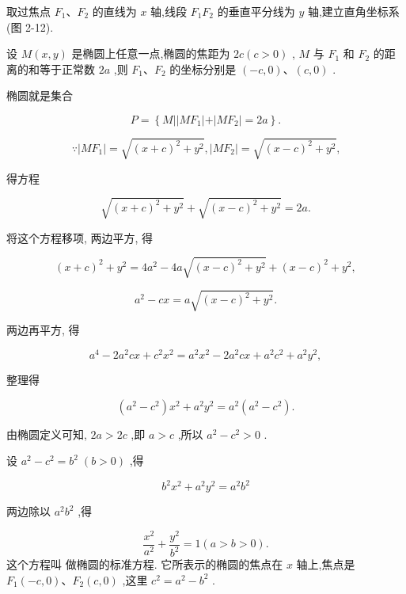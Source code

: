 \documentclass[lang=cn,newtx,10.5pt,scheme=chinese]{elegantbook}
\begin{document}
取过焦点 \({F}_{1}\text{、}{F}_{2}\) 的直线为 \(x\) 轴,线段 \({F}_{1}{F}_{2}\) 的垂直平分线为 \(y\) 轴,建立直角坐标系 (图 2-12).

设 \(M\left( {x,y}\right)\) 是椭圆上任意一点,椭圆的焦距为 \({2c}\left( {c > 0}\right)\) , \(M\) 与 \({F}_{1}\) 和 \({F}_{2}\) 的距离的和等于正常数 \({2a}\) ,则 \({F}_{1}\text{、}{F}_{2}\) 的坐标分别是 \(\left( {-c,0}\right) \text{、}\left( {c,0}\right)\) .

椭圆就是集合

\[
  P = \left\{ {M\left| \right| M{F}_{1}\left| +\right| M{F}_{2} \mid = {2a}}\right\} .
\]

\[
  \because \left| {M{F}_{1}}\right| = \sqrt{{\left( x + c\right) }^{2} + {y}^{2}},\left| {M{F}_{2}}\right| = \sqrt{{\left( x - c\right) }^{2} + {y}^{2}}\text{,}
\]

得方程

\[
  \sqrt{{\left( x + c\right) }^{2} + {y}^{2}} + \sqrt{{\left( x - c\right) }^{2} + {y}^{2}} = {2a}.
\]

将这个方程移项, 两边平方, 得

\[
    {\left( x + c\right) }^{2} + {y}^{2} = 4{a}^{2} - {4a}\sqrt{{\left( x - c\right) }^{2} + {y}^{2}} + {\left( x - c\right) }^{2} + {y}^{2},
\]

\[
    {a}^{2} - {cx} = a\sqrt{{\left( x - c\right) }^{2} + {y}^{2}}.
\]

两边再平方, 得

\[
    {a}^{4} - 2{a}^{2}{cx} + {c}^{2}{x}^{2} = {a}^{2}{x}^{2} - 2{a}^{2}{cx} + {a}^{2}{c}^{2} + {a}^{2}{y}^{2},
\]

整理得

\[
  \left( {{a}^{2} - {c}^{2}}\right) {x}^{2} + {a}^{2}{y}^{2} = {a}^{2}\left( {{a}^{2} - {c}^{2}}\right) .
\]

由椭圆定义可知, \({2a} > {2c}\) ,即 \(a > c\) ,所以 \({a}^{2} - {c}^{2} > 0\) .

设 \({a}^{2} - {c}^{2} = {b}^{2}\;\left( {b > 0}\right)\) ,得

\[
    {b}^{2}{x}^{2} + {a}^{2}{y}^{2} = {a}^{2}{b}^{2}
\]

两边除以 \({a}^{2}{b}^{2}\) ,得
\begin{definition}[椭圆的标准方程] 
\[
  \frac{{x}^{2}}{{a}^{2}} + \frac{{y}^{2}}{{b}^{2}} = 1\left( {a > b > 0}\right) . \tag{1}
\]
这个方程叫 做椭圆的标准方程. 它所表示的椭圆的焦点在 \(x\) 轴上,焦点是 \({F}_{1}\left( {-c,0}\right) \text{、}{F}_{2}\left( {c,0}\right)\) ,这里 \({c}^{2} = {a}^{2} - {b}^{2}\) .
\end{definition}
\end{document}
